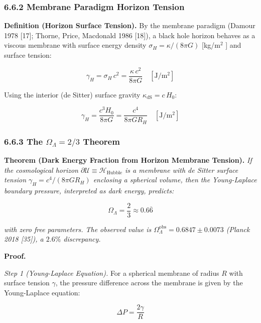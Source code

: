 \documentclass[11pt,a4paper]{article}
\theoremstyle{definition}
\theoremstyle{remark}
\begin{document}
\subsubsection{6.6.2 Membrane Paradigm Horizon Tension}

\textbf{Definition (Horizon Surface Tension).} By the membrane paradigm (Damour 1978 [17]; Thorne, Price, Macdonald 1986 [18]), a black hole horizon behaves as a viscous membrane with surface energy density $\sigma_H = \kappa / (8\pi G)$ [kg/m$^2$ ] and surface tension:


\begin{equation}
\gamma_H = \sigma_H \, c^2 = \frac{\kappa \, c^2}{8\pi G} \quad [\mathrm{J/m^2}]
\end{equation}


Using the interior (de Sitter) surface gravity $\kappa_{\text{dS}} = c \, H_0$:


\begin{equation}
\gamma_H = \frac{c^3 H_0}{8\pi G} = \frac{c^4}{8\pi G R_H} \quad [\mathrm{J/m^2}]
\end{equation}


\subsubsection{6.6.3 The $\Omega_\Lambda = 2/3$ Theorem}

\textbf{Theorem (Dark Energy Fraction from Horizon Membrane Tension).} \textit{If the cosmological horizon $\partial \mathcal{U} \equiv \mathcal{H}_{\text{Hubble}}$ is a membrane with de Sitter surface tension $\gamma_H = c^4/(8\pi G R_H)$ enclosing a spherical volume, then the Young-Laplace boundary pressure, interpreted as dark energy, predicts:}


\begin{equation}
\boxed{\Omega_\Lambda = \frac{2}{3} \approx 0.6\overline{6}}
\end{equation}


\textit{with zero free parameters. The observed value is $\Omega_\Lambda^{\text{obs}} = 0.6847 \pm 0.0073$ (Planck 2018 [35]), a $2.6\%$ discrepancy.}

\textbf{Proof.}

\textit{Step 1 (Young-Laplace Equation).} For a spherical membrane of radius $R$ with surface tension $\gamma$, the pressure difference across the membrane is given by the Young-Laplace equation:


\begin{equation}
\Delta P = \frac{2\gamma}{R}
\end{equation}
\end{document}

